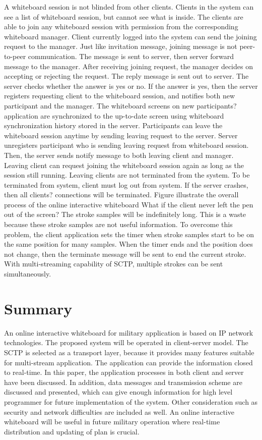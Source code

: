 \documentclass[conference]{IEEEtran}
\begin{document}
A whiteboard session is not blinded from other clients. Clients in the system can see a list of whiteboard session, but cannot see what is inside. The clients are able to join any whiteboard session with permission from the corresponding whiteboard manager. Client currently logged into the system can send the joining request to the manager. Just like invitation message, joining message is not peer-to-peer communication. The message is sent to server, then server forward message to the manager. After receiving joining request, the manager decides on accepting or rejecting the request. The reply message is sent out to server. The server checks whether the answer is yes or no. If the answer is yes, then the server registers requesting client to the whiteboard session, and notifies both new participant and the manager. The whiteboard screens on new participants? application are synchronized to the up-to-date screen using whiteboard synchronization history stored in the server.
Participants can leave the whiteboard session anytime by sending leaving request to the server. Server unregisters participant who is sending leaving request from whiteboard session. Then, the server sends notify message to both leaving client and manager. Leaving client can request joining the whiteboard session again as long as the session still running. Leaving clients are not terminated from the system. To be terminated from system, client must log out from system. If the server crashes, then all clients? connections will be terminated. Figure  illustrate the overall process of the online interactive whiteboard
   What if the client never left the pen out of the screen? The stroke samples will be indefinitely long. This is a waste because these stroke samples are not useful information. To overcome this problem, the client application sets the timer when stroke samples start to be on the same position for many samples. When the timer ends and the position does not change, then the terminate message will be sent to end the current stroke. With multi-streaming capability of SCTP, multiple strokes can be sent simultaneously.

\section{Summary}
An online interactive whiteboard for military application is based on IP network technologies. 
The proposed system will be operated in client-server model. 
The SCTP is selected as a transport layer, because it provides many features suitable for multi-stream application. 
The application can provide the information closed to real-time. 
In this paper, the application processes in both client and server have been discussed. 
In addition, data messages and transmission scheme are discussed and presented, which can give enough information for high level programmer for future implementation of the system. 
Other consideration such as security and network difficulties are included as well. 
An online interactive whiteboard will be useful in future military operation where real-time distribution and updating of plan is crucial.
\end{document}
